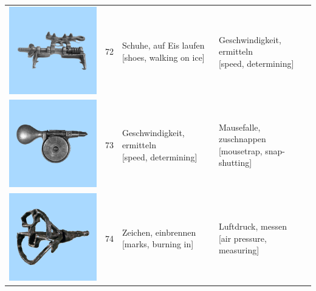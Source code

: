 \documentclass[
  english,
  man,floatsintext]{apa7}
\begin{document}
\begin{center}
\begin{ThreePartTable}
{\begin{longtable}{llll}
\includegraphics[valign=c, scale=0.23]{../materials/unfamiliar/72.png} & 72 & \makecell[l]{Schuhe, auf Eis laufen\\{[shoes, walking on ice]}} & \makecell[l]{Geschwindigkeit, ermitteln\\{[speed, determining]}}\\
\includegraphics[valign=c, scale=0.23]{../materials/unfamiliar/73.png} & 73 & \makecell[l]{Geschwindigkeit, ermitteln\\{[speed, determining]}} & \makecell[l]{Mausefalle, zuschnappen\\{[mousetrap, snap-shutting]}}\\
\includegraphics[valign=c, scale=0.23]{../materials/unfamiliar/74.png} & 74 & \makecell[l]{Zeichen, einbrennen\\{[marks, burning in]}} & \makecell[l]{Luftdruck, messen\\{[air pressure, measuring]}}\\

\end{longtable}}
\end{ThreePartTable}
\end{center}
\end{document}
